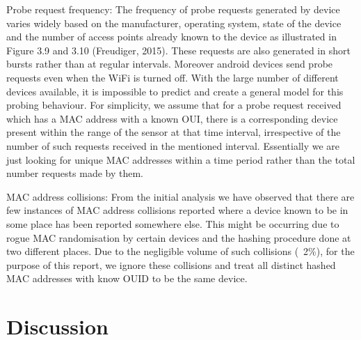 Probe request frequency: The frequency of probe requests generated by device varies widely based on the manufacturer, operating system, state of the device and the number of access points already known to the device as illustrated in Figure 3.9 and 3.10 (Freudiger, 2015). These requests are also generated in short bursts rather than at regular intervals. Moreover android devices send probe requests even when the WiFi is turned off. With the large number of different devices available, it is impossible to predict and create a general model for this probing behaviour. For simplicity, we assume that for a probe request received which has a MAC address with a known OUI, there is a corresponding device present within the range of the sensor at that time interval, irrespective of the number of such requests received in the mentioned interval. Essentially we are just looking for unique MAC addresses within a time period rather than the total number requests made by them.

MAC address collisions: From the initial analysis we have observed that there are few instances of MAC address collisions reported where a device known to be in some place has been reported somewhere else. This might be occurring due to rogue MAC randomisation by certain devices and the hashing procedure done at two different places. Due to the negligible volume of such collisions (~2\%), for the purpose of this report, we ignore these collisions and treat all distinct hashed MAC addresses with know OUID to be the same device.


\section{Discussion}
